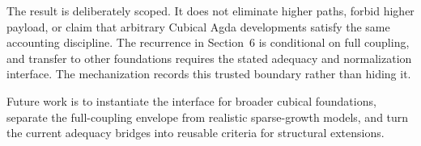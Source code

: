 \documentclass{lmcs}
\begin{document}
The result is deliberately scoped.  It does not eliminate higher paths, forbid
higher payload, or claim that arbitrary Cubical Agda developments satisfy the
same accounting discipline.  The recurrence in Section~6 is conditional on full
coupling, and transfer to other foundations requires the stated adequacy and
normalization interface.  The mechanization records this trusted boundary rather
than hiding it.

Future work is to instantiate the interface for broader cubical foundations,
separate the full-coupling envelope from realistic sparse-growth models, and
turn the current adequacy bridges into reusable criteria for structural
extensions.





\end{document}
